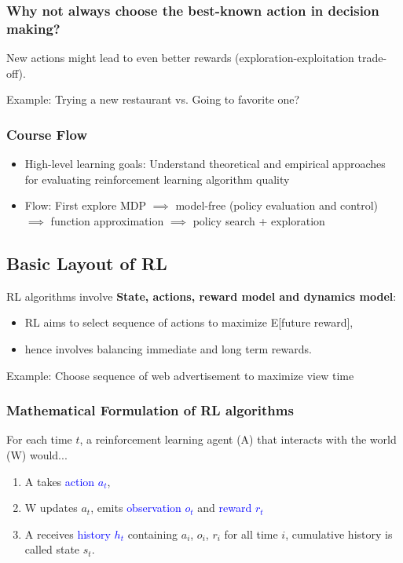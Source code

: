 \documentclass{article}
\begin{document}
\begin{hintbox}
    \subsubsection*{Why not always choose the best-known action in decision making?}
    New actions might lead to even better rewards (exploration-exploitation trade-off).
    \begin{prfbox}
        Example: Trying a new restaurant vs. Going to favorite one?
    \end{prfbox}
\end{hintbox}

\subsubsection{Course Flow}
\begin{itemize}
\item High-level learning goals:
    Understand theoretical and empirical approaches for evaluating reinforcement learning algorithm quality
\item Flow: 
    First explore MDP $\implies$ model-free (policy evaluation and control) $\implies$ function approximation $\implies$ policy search + exploration
\end{itemize}

\subsection{Basic Layout of RL}
RL algorithms involve \textbf{State, actions, reward model and dynamics model}:
\begin{itemize}
\item RL aims to select sequence of actions to maximize E[future reward],
\item hence involves balancing immediate and long term rewards.
\end{itemize}
Example: Choose sequence of web advertisement to maximize view time

\begin{defbox}
  \subsubsection*{Mathematical Formulation of RL algorithms}
  For each time $t$, a reinforcement learning agent (A) that interacts with the world (W) would...
  \begin{enumerate}
  \item A takes \textcolor{blue}{action $a_t$},
  \item W updates $a_t$, emits \textcolor{blue}{observation $o_t$} and \textcolor{blue}{reward $r_t$}
  \item A receives \textcolor{blue}{history $h_t$} containing {$a_i$, $o_i$, $r_i$} for all time $i$, cumulative history is called state $s_t$.
  \end{enumerate}
\end{defbox}
\end{document}
